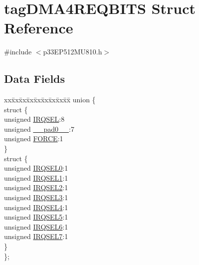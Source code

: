 \hypertarget{structtag_d_m_a4_r_e_q_b_i_t_s}{}\section{tag\+D\+M\+A4\+R\+E\+Q\+B\+I\+TS Struct Reference}
\label{structtag_d_m_a4_r_e_q_b_i_t_s}


{\ttfamily \#include $<$p33\+E\+P512\+M\+U810.\+h$>$}

\subsection*{Data Fields}
\begin{DoxyCompactItemize}
\item 
\begin{tabbing}
xx\=xx\=xx\=xx\=xx\=xx\=xx\=xx\=xx\=\kill
union \{\\
\>struct \{\\
\>\>unsigned \hyperlink{structtag_d_m_a4_r_e_q_b_i_t_s_a5e70ba01366ab2f37371d52661dd93b2}{IRQSEL}:8\\
\>\>unsigned \hyperlink{structtag_d_m_a4_r_e_q_b_i_t_s_adf71f3d8410c1f1dbbc96680a92c49af}{\_\_pad0\_\_}:7\\
\>\>unsigned \hyperlink{structtag_d_m_a4_r_e_q_b_i_t_s_a9b378a7ffc1ab4bc4a3710fb36389180}{FORCE}:1\\
\>\} \\
\>struct \{\\
\>\>unsigned \hyperlink{structtag_d_m_a4_r_e_q_b_i_t_s_ac73241b8f783760c9192dfd8a0773cad}{IRQSEL0}:1\\
\>\>unsigned \hyperlink{structtag_d_m_a4_r_e_q_b_i_t_s_a45e1f083e5a8a59f25acc35910732426}{IRQSEL1}:1\\
\>\>unsigned \hyperlink{structtag_d_m_a4_r_e_q_b_i_t_s_a60dda7474727b3624ca25fa0067a8924}{IRQSEL2}:1\\
\>\>unsigned \hyperlink{structtag_d_m_a4_r_e_q_b_i_t_s_aeaafe1b8c89398ed382054ab628aed78}{IRQSEL3}:1\\
\>\>unsigned \hyperlink{structtag_d_m_a4_r_e_q_b_i_t_s_a91c4162e0f3d4ac7adcdb49302f19840}{IRQSEL4}:1\\
\>\>unsigned \hyperlink{structtag_d_m_a4_r_e_q_b_i_t_s_a6382d50430464cf20b3dee3dbf2e8c01}{IRQSEL5}:1\\
\>\>unsigned \hyperlink{structtag_d_m_a4_r_e_q_b_i_t_s_ace52408ef8c29561f3c56a3fbcbc8217}{IRQSEL6}:1\\
\>\>unsigned \hyperlink{structtag_d_m_a4_r_e_q_b_i_t_s_acce7dedecdf1f53cdbead3edf7c5d53a}{IRQSEL7}:1\\
\>\} \\
\}; \\

\end{tabbing}\end{DoxyCompactItemize}


